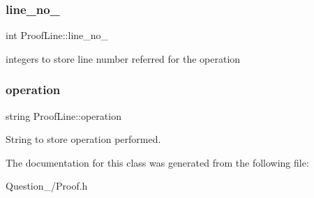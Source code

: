 \subsubsection{\texorpdfstring{line\+\_\+no\+\_}{line\_no\_1}}
{\footnotesize\ttfamily int Proof\+Line\+::line\+\_\+no\+\_\hspace{0.3cm}{\ttfamily [protected]}}

integers to store line number referred for the operation \mbox{\label{classProofLine_a45395cbc2a93d336cfd867b343bc27a7}} 
\subsubsection{\texorpdfstring{operation}{operation}}
{\footnotesize\ttfamily string Proof\+Line\+::operation\hspace{0.3cm}{\ttfamily [protected]}}

String to store operation performed. 

The documentation for this class was generated from the following file\+:\begin{DoxyCompactItemize}
\item 
Question\+\_/Proof.\+h\end{DoxyCompactItemize}

